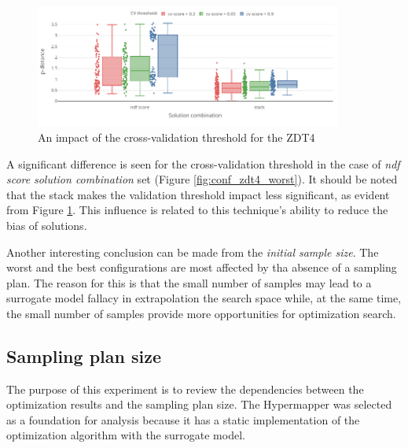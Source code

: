         \begin{figure}[h!] 
            \centering
            \includegraphics[width=0.90\textwidth]{content/images/conf_zdt4_cv_score}
            \caption[An impact of the cross-validation threshold for the ZDT4]{An impact of the cross-validation threshold for the ZDT4} 
            \label{fig:conf_zdt4_sign}    
        \end{figure}


    A significant difference is seen for the cross-validation threshold in the case of \textit{ndf score} \emph{solution combination} set (Figure \ref{fig:conf_zdt4_worst}). It should be noted that the stack makes the validation threshold impact less significant, as evident from Figure \ref{fig:conf_zdt4_sign}. This influence is related to this technique's ability to reduce the bias of solutions. 
    
    Another interesting conclusion can be made from the \emph{initial sample size}. The worst and the best configurations are most affected by tha absence of a sampling plan. The reason for this is that the small number of samples may lead to a surrogate model fallacy in extrapolation the search space while, at the same time, the small number of samples provide more opportunities for optimization search.

    \subsection{Sampling plan size}
    The purpose of this experiment is to review the dependencies between the optimization results and the sampling plan size. The Hypermapper was selected as a foundation for analysis because it has a static implementation of the optimization algorithm with the surrogate model.

